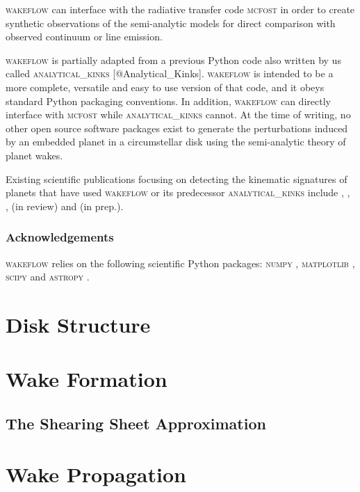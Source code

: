 \textsc{wakeflow} can interface with the radiative transfer code  \textsc{mcfost} \citep{pinte2006,pinte2009} in order to create synthetic observations of the semi-analytic models for direct comparison with observed continuum or line emission.

\textsc{wakeflow} is partially adapted from a previous Python code also written by us called \textsc{analytical\_kinks} [@Analytical\_Kinks]. 
\textsc{wakeflow} is intended to be a more complete, versatile and easy to use version of that code, and it obeys standard Python packaging conventions.
In addition, \textsc{wakeflow} can directly interface with \textsc{mcfost} while \textsc{analytical\_kinks} cannot.
At the time of writing, no other open source software packages exist to generate the perturbations induced by an embedded planet in a circumstellar disk using the semi-analytic theory of planet wakes.

Existing scientific publications focusing on detecting the kinematic signatures of planets that have used \textsc{wakeflow} or its predecessor \textsc{analytical\_kinks} include \citet{bollati2021}, \citet{calcino2022}, \citet{teague2022}, \citeauthor{garginreview} (in review) and \citeauthor{fasanoinprep.} (in prep.).

\subsubsection{Acknowledgements}

\textsc{wakeflow} relies on the following scientific Python packages: \textsc{numpy} \citep{harris2020}, \textsc{matplotlib} \citep{hunter2007}, \textsc{scipy} \citep{virtanen2020} and \textsc{astropy} \citep{astropycollaboration2022}.

\section{Disk Structure} \label{sec:diskstruct}

\section{Wake Formation} \label{sec:wakeform}

\subsection{The Shearing Sheet Approximation}

\section{Wake Propagation} \label{sec:wakeprop}

